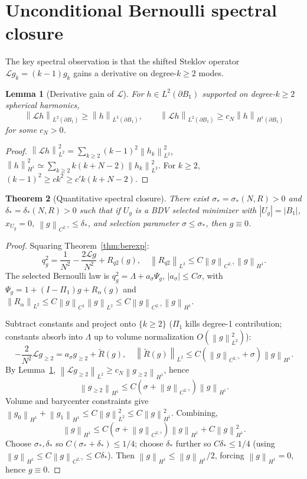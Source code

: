 \documentclass[11pt]{article}
\newtheorem{theorem}{Theorem}
\newtheorem{lemma}[theorem]{Lemma}
\theoremstyle{definition}
\newcommand{\norm}[1]{\left\|#1\right\|}
\newcommand{\abs}[1]{\left|#1\right|}
\begin{document}
\section{Unconditional Bernoulli spectral closure}

The key spectral observation is that the shifted Steklov operator
$\mathcal L g_k=(k-1)g_k$ gains a derivative on degree-$k\ge2$ modes.

\begin{lemma}[Derivative gain of $\mathcal L$]\label{lem:Lgain}
For $h\in L^2(\partial B_1)$ supported on degree-$k\ge2$ spherical harmonics,
\[
\norm{\mathcal L h}_{L^2(\partial B_1)}\ge\norm{h}_{L^2(\partial B_1)},
\qquad
\norm{\mathcal L h}_{L^2(\partial B_1)}\ge c_N\norm{h}_{H^1(\partial B_1)}
\]
for some $c_N>0$.
\end{lemma}

\begin{proof}
$\norm{\mathcal Lh}_{L^2}^2=\sum_{k\ge2}(k-1)^2\norm{h_k}_{L^2}^2$,
$\norm{h}_{H^1}^2\simeq\sum_{k\ge2}k(k+N-2)\norm{h_k}_{L^2}^2$. For $k\ge2$,
$(k-1)^2\ge ck^2\ge c'k(k+N-2)$.
\end{proof}

\begin{theorem}[Quantitative spectral closure]\label{thm:closure}
There exist $\sigma_*=\sigma_*(N,R)>0$ and $\delta_*=\delta_*(N,R)>0$ such
that if $U_g$ is a BDV selected minimizer with
$\abs{U_g}=\abs{B_1}$, $x_{U_g}=0$,
$\norm{g}_{C^{2,\gamma}}\le\delta_*$, and selection parameter
$\sigma\le\sigma_*$, then $g\equiv0$.
\end{theorem}

\begin{proof}
Squaring Theorem~\ref{thm:berexp}:
\[
q_g^2=\frac{1}{N^2}-\frac{2\mathcal L g}{N^2}+R_{q2}(g),
\quad\norm{R_{q2}}_{L^2}\le C\norm{g}_{C^{2,\gamma}}\norm{g}_{H^1}.
\]
The selected Bernoulli law is $q_g^2=\Lambda+a_\sigma\Psi_g$,
$\abs{a_\sigma}\le C\sigma$, with $\Psi_g=1+(I-\Pi_1)g+R_\alpha(g)$ and
$\norm{R_\alpha}_{L^2}\le C\norm{g}_{C^1}\norm{g}_{L^2}\le C\norm{g}_{C^{2,\gamma}}\norm{g}_{H^1}$.

Subtract constants and project onto $\{k\ge2\}$ ($\Pi_1$ kills degree-1
contribution; constants absorb into $\Lambda$ up to volume normalization
$O(\norm{g}_{L^2}^2)$):
\[
-\frac{2}{N^2}\mathcal L g_{\ge2}=a_\sigma g_{\ge2}+\widetilde R(g),
\quad
\norm{\widetilde R(g)}_{L^2}\le C(\norm{g}_{C^{2,\gamma}}+\sigma)\norm{g}_{H^1}.
\]
By Lemma~\ref{lem:Lgain}, $\norm{\mathcal L g_{\ge2}}_{L^2}\ge c_N\norm{g_{\ge2}}_{H^1}$,
hence
\[
\norm{g_{\ge2}}_{H^1}\le C(\sigma+\norm{g}_{C^{2,\gamma}})\norm{g}_{H^1}.
\]
Volume and barycenter constraints give
$\norm{g_0}_{H^1}+\norm{g_1}_{H^1}\le C\norm{g}_{L^2}^2\le C\norm{g}_{H^1}^2$.
Combining,
\[
\norm{g}_{H^1}
\le C(\sigma+\norm{g}_{C^{2,\gamma}})\norm{g}_{H^1}+C\norm{g}_{H^1}^2.
\]
Choose $\sigma_*,\delta_*$ so $C(\sigma_*+\delta_*)\le 1/4$; choose $\delta_*$
further so $C\delta_*\le 1/4$ (using
$\norm{g}_{H^1}\le C\norm{g}_{C^{2,\gamma}}\le C\delta_*$). Then
$\norm{g}_{H^1}\le\norm{g}_{H^1}/2$, forcing $\norm{g}_{H^1}=0$, hence
$g\equiv0$.
\end{proof}
\end{document}
